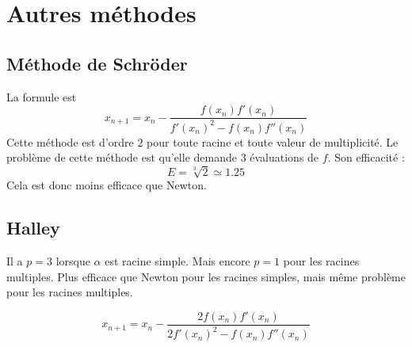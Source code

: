 \section{Autres méthodes}

\subsection{Méthode de Schröder}

La formule est
\begin{equation}
    x_{n+1}=x_n-\frac{ f(x_n)f'(x_n) }{ f'(x_n)^2-f(x_n)f''(x_n) }
\end{equation}
Cette méthode est d'ordre \( 2\) pour toute racine et toute valeur de multiplicité. Le problème de cette méthode est qu'elle demande \( 3\) évaluations de \( f\). Son efficacité :
\begin{equation}
    E=\sqrt[3]{ 2 }\simeq 1.25
\end{equation}
Cela est donc moins efficace que Newton.

\subsection{Halley}

Il a \( p=3\) lorsque \( \alpha\) est racine simple. Mais encore \( p=1\) pour les racines multiples. Plus efficace que Newton pour les racines simples, mais même problème pour les racines multiples.

\begin{equation}
    x_{n+1}=x_n-\frac{ 2f(x_n)f'(x_n) }{ 2f'(x_n)^2-f(x_n)f''(x_n) }
\end{equation}

